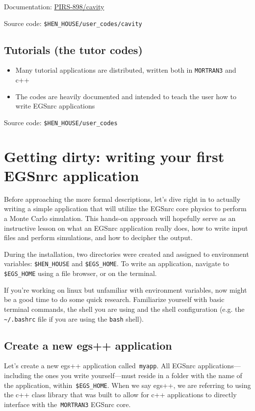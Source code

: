 \documentclass[12pt,twoside]{article}
\begin{document}
Documentation: \href{http://nrc-cnrc.github.io/EGSnrc/doc/pirs898/cavity.html}{PIRS-898/cavity}

Source code: \Verb+$HEN_HOUSE/user_codes/cavity+

\subsection{Tutorials (the tutor codes)}
\begin{itemize}
\item Many tutorial applications are distributed, written both in \Verb+MORTRAN3+ and c++
\item The codes are heavily documented and intended to teach the user how to write EGSnrc applications
\end{itemize}

Source code: \Verb+$HEN_HOUSE/user_codes+


\clearpage
\section{Getting dirty: writing your first EGSnrc application}
\label{myapp}

Before approaching the more formal descriptions, let's dive right in to actually writing a simple application that will utilize the EGSnrc core physics to perform a Monte Carlo simulation. This hands-on approach will hopefully serve as an instructive lesson on what an EGSnrc application really does, how to write input files and perform simulations, and how to decipher the output.

During the installation, two directories were created and assigned to environment variables: \Verb+$HEN_HOUSE+ and \Verb+$EGS_HOME+. To write an application, navigate to \Verb+$EGS_HOME+ using a file browser, or on the terminal.

If you're working on linux but unfamiliar with environment variables, now might be a good time to do some quick research. Familiarize yourself with basic terminal commands, the shell you are using and the shell configuration (e.g. the \Verb+~/.bashrc+ file if you are using the \Verb+bash+ shell).

\subsection{Create a new egs++ application}

Let's create a new egs++ application called \,\Verb|myapp|. All EGSnrc
applications---including the ones you write yourself---must reside in a
folder with the name of the application, within \,\Verb|$EGS_HOME|.
When we say egs++, we are referring to using the c++ class library that was
built to allow for c++ applications to directly interface with
the \,\Verb|MORTRAN3| EGSnrc core.
\end{document}
